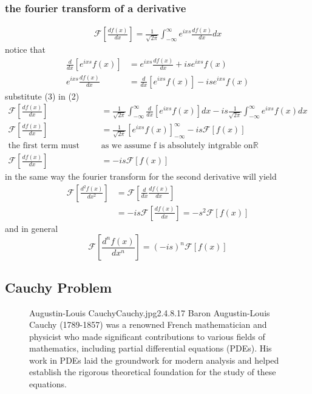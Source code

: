\documentclass[]{article}
\begin{document}
\subsubsection*{the fourier transform of a derivative}
\begin{align}
    \mathscr{F}\left[\frac{df\left(x\right)}{dx}\right]=\frac{1}{\sqrt{2\pi}}\int_{-\infty}^{\infty}e^{ixs}\frac{df\left(x\right)}{dx}dx
\end{align}
notice that
\begin{align}
\frac{d}{dx}\left[e^{ixs}f\left(x\right)\right] &= e^{ixs}\frac{df\left(x\right)}{dx} + ise^{ixs}f\left(x\right)
\\
e^{ixs}\frac{df\left(x\right)}{dx} &= \frac{d}{dx}\left[e^{ixs}f\left(x\right)\right] -ise^{ixs}f\left(x\right)
\end{align}
substitute (3) in (2)
\begin{align*}
\mathscr{F}\left[\frac{df\left(x\right)}{dx}\right] &= \frac{1}{\sqrt{2\pi}}
\int_{-\infty}^{\infty}\frac{d}{dx}\left[e^{ixs}f\left(x\right)\right]dx - is\frac{1}{\sqrt{2\pi}}\int_{-\infty}^{\infty}e^{ixs}f\left(x\right)dx
\\
\mathscr{F}\left[\frac{df\left(x\right)}{dx}\right] &= \frac{1}{\sqrt{2\pi}}{\left[e^{ixs}f\left(x\right)\right]}_{-\infty}^{\infty} - is \mathscr{F}\left[f\left(x\right)\right]
\\
\text{the  first term must vanish }&\text{as we assume f is absolutely intgrable on} \mathbb{R}
\\
\mathscr{F}\left[\frac{df\left(x\right)}{dx}\right] &= - is \mathscr{F}\left[f\left(x\right)\right]
\end{align*}
in the same way the fourier transform for the second derivative will yield
\begin{align*}
\mathscr{F}\left[\frac{d^2f\left(x\right)}{dx^2}\right] &=  \mathscr{F}\left[\frac{d}{dx}\frac{df\left(x\right)}{dx}\right]
\\
&= - is\mathscr{F}\left[\frac{df\left(x\right)}{dx}\right] = -s^2 \mathscr{F}\left[f\left(x\right)\right]
\end{align*}
and in general
\[
    \mathscr{F}\left[\frac{d^nf\left(x\right)}{dx^n}\right] = {(-is)}^n\mathscr{F}\left[f\left(x\right)\right]    
\]
\setcounter{equation}{0}
\subsection{Cauchy Problem}
\begin{figure}[b]
    \begin{enrichment}{Augustin-Louis Cauchy}{Cauchy.jpg}{2.4}{.8}{.17}
        Baron Augustin-Louis Cauchy (1789-1857) was a renowned French mathematician and physicist who made significant contributions to various fields of mathematics, including partial differential equations (PDEs). His work in PDEs laid the groundwork for modern analysis and helped establish the rigorous theoretical foundation for the study of these equations.
    \end{enrichment}    
\end{figure}
\end{document}
